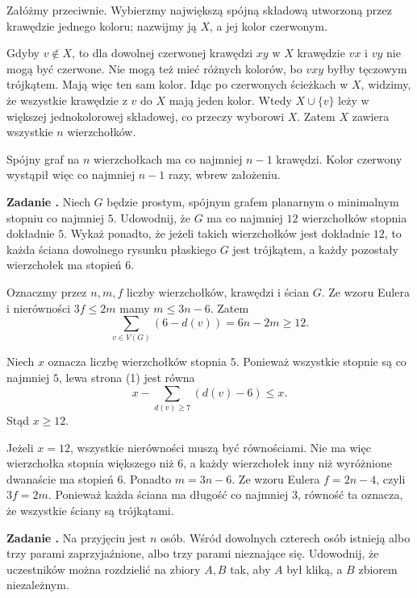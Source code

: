 \documentclass{lecture-kuznia}
\newcounter{zadanie}
\newenvironment{zadanie}[1]{%
	\refstepcounter{zadanie}%
	\par\medskip\noindent
	\textbf{Zadanie \thezadanie.}\quad
}{\par\medskip}
\begin{document}
\begin{solutionbox}
	Załóżmy przeciwnie. Wybierzmy największą spójną składową utworzoną przez
	krawędzie jednego koloru; nazwijmy ją $X$, a jej kolor czerwonym.

	Gdyby $v\notin X$, to dla dowolnej czerwonej krawędzi $xy$ w $X$ krawędzie
	$vx$ i $vy$ nie mogą być czerwone. Nie mogą też mieć różnych kolorów, bo
	$vxy$ byłby tęczowym trójkątem. Mają więc ten sam kolor. Idąc po czerwonych
	ścieżkach w $X$, widzimy, że wszystkie krawędzie z $v$ do $X$ mają jeden
	kolor. Wtedy $X\cup\{v\}$ leży w większej jednokolorowej składowej, co
	przeczy wyborowi $X$. Zatem $X$ zawiera wszystkie $n$ wierzchołków.

	Spójny graf na $n$ wierzchołkach ma co najmniej $n-1$ krawędzi. Kolor
	czerwony wystąpił więc co najmniej $n-1$ razy, wbrew założeniu.
\end{solutionbox}

\begin{zadanie}{średnie} %
	Niech $G$ będzie prostym, spójnym grafem planarnym o minimalnym stopniu co
	najmniej $5$. Udowodnij, że $G$ ma co najmniej $12$ wierzchołków stopnia
	dokładnie $5$. Wykaż ponadto, że jeżeli takich wierzchołków jest dokładnie
	$12$, to każda ściana dowolnego rysunku płaskiego $G$ jest trójkątem, a
	każdy pozostały wierzchołek ma stopień $6$.
\end{zadanie}

\begin{solutionbox}
	Oznaczmy przez $n,m,f$ liczby wierzchołków, krawędzi i ścian $G$. Ze wzoru
	Eulera i nierówności $3f\leqslant2m$ mamy $m\leqslant3n-6$. Zatem
	\[
		\sum_{v\in V(G)}(6-d(v))=6n-2m\geqslant12. \tag{1}
	\]

	Niech $x$ oznacza liczbę wierzchołków stopnia $5$. Ponieważ wszystkie
	stopnie są co najmniej $5$, lewa strona (1) jest równa
	\[
		x-\sum_{d(v)\geqslant7}(d(v)-6)\leqslant x.
	\]
	Stąd $x\geqslant12$.

	Jeżeli $x=12$, wszystkie nierówności muszą być równościami. Nie ma więc
	wierzchołka stopnia większego niż $6$, a każdy wierzchołek inny niż
	wyróżnione dwanaście ma stopień $6$. Ponadto $m=3n-6$. Ze wzoru Eulera
	$f=2n-4$, czyli $3f=2m$. Ponieważ każda ściana ma długość co najmniej $3$,
	równość ta oznacza, że wszystkie ściany są trójkątami.
\end{solutionbox}

\begin{zadanie}{średnie} %
	Na przyjęciu jest $n$ osób. Wśród dowolnych czterech osób istnieją albo
	trzy parami zaprzyjaźnione, albo trzy parami nieznające się. Udowodnij, że
	uczestników można rozdzielić na zbiory $A,B$ tak, aby $A$ był kliką, a $B$
	zbiorem niezależnym.
\end{zadanie}
\end{document}

